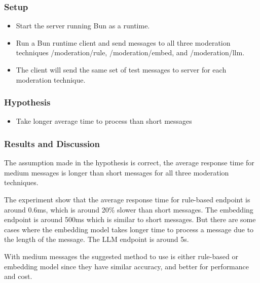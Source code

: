 \documentclass[
	english,
	accentcolor=9c,
	type=intern,
	marginpar=false,
	11pt
]{tudapub}
\begin{document}
\subsubsection{Setup}
\begin{itemize}
    \item Start the server running Bun as a runtime.
    \item Run a Bun runtime client and send messages to all three moderation techniques /moderation/rule, /moderation/embed, and /moderation/llm.
    \item The client will send the same set of test messages to server for each moderation technique.
\end{itemize}

\subsubsection{Hypothesis}
\begin{itemize}
    \item Take longer average time to process than short messages
\end{itemize}

\subsubsection{Results and Discussion}
The assumption made in the hypothesis is correct, the average response time for medium messages is longer than short messages for all three moderation techniques.

The experiment show that the average response time for rule-based endpoint is around 0.6ms, which is around 20\% slower than short messages.
The embedding endpoint is around 500ms which is similar to short messages.
But there are some cases where the embedding model takes longer time to process a message due to the length of the message.
The LLM endpoint is around 5s.

With medium messages the suggested method to use is either rule-based or embedding model since they have similar accuracy, and better for performance and cost.
\end{document}

